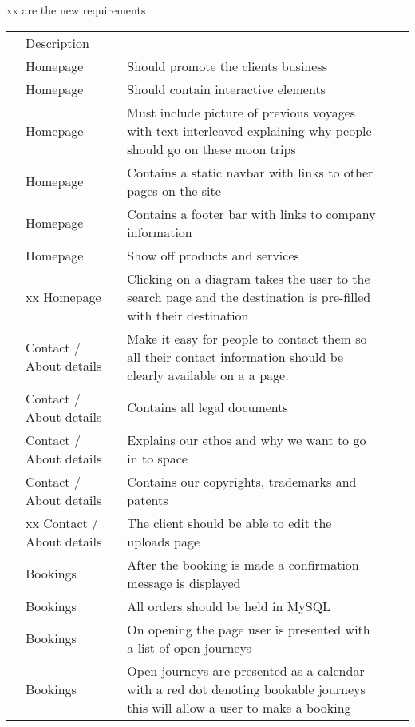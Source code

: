 \documentclass{article}
\newcounter{rowcount}
\begin{document}
xx are the new requirements 

    \begin{tabular} {>{\stepcounter{rowcount}\therowcount}p{0.5cm}@{}*{2}{p{3cm}|p{12cm}}}
    \hline
       \multicolumn{2}{l}{Functional Requirements} & Description \\
       \noalign{\setcounter{rowcount}{0}} \hline
    & Homepage & Should promote the clients business \\
    \hline
    & Homepage & Should contain interactive elements \\
    \hline
    & Homepage & Must include picture of previous voyages with text interleaved explaining why people should go on these moon trips\\
    \hline
    & Homepage & Contains a static navbar with links to other pages on the site\\
    \hline
    & Homepage & Contains a footer bar with links to company information \\
    \hline
    & Homepage & Show off products and services \\
    \hline
    & xx Homepage & Clicking on a diagram takes the user to the search page and the destination is pre-filled with their destination \\
    \hline
    & Contact / About details & Make it easy for people to contact them so all their contact information should be clearly available on a a page. \\
    \hline
    & Contact / About details & Contains all legal documents \\
    \hline
    & Contact / About details & Explains our ethos and why we want to go in to space \\
    \hline
    & Contact / About details & Contains our copyrights, trademarks and patents \\
    \hline
    & xx Contact / About details & The client should be able to edit the uploads page \\
    \hline
    & Bookings & After the booking is made a confirmation message is displayed \\
    \hline
    & Bookings & All orders should be held in MySQL\\
    \hline
    & Bookings & On opening the page user is presented with a list of open journeys \\
    \hline
    & Bookings & Open journeys are presented as a calendar with a red dot denoting bookable journeys this will allow a user to make a booking\\

\end{tabular}
\end{document}

